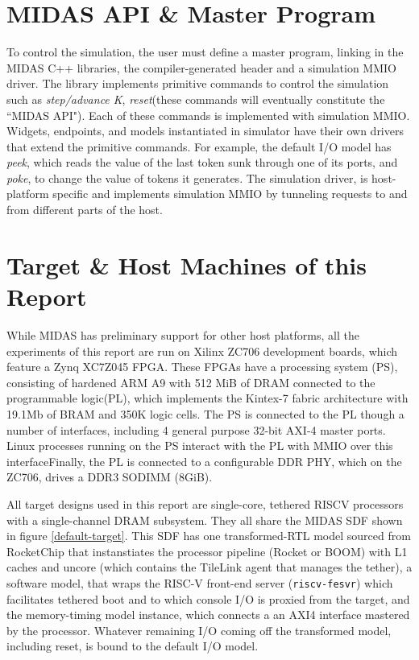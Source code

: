 \section{MIDAS API \& Master Program}

To control the simulation, the user must define a master program, linking in
the MIDAS C++ libraries, the compiler-generated header and a simulation MMIO
driver.  The library implements primitive commands to control the simulation
such as \emph{step/advance K}, \emph{reset}(these commands will eventually
constitute the ``MIDAS API"). Each of these commands is implemented with
simulation MMIO.  Widgets, endpoints, and models instantiated in simulator have
their own drivers that extend the primitive commands.  For example, the default
I/O model has \emph{peek}, which reads the value of the last token sunk through
one of its ports, and \emph{poke}, to change the value of tokens it generates.  The
simulation driver, is host-platform specific and implements simulation MMIO by
tunneling requests to and from different parts of the host.

\section{Target \& Host Machines of this Report}\label{sec:targetandhostmachines}

While MIDAS has preliminary support for other host platforms, all the
experiments of this report are run on Xilinx ZC706 development boards, which
feature a Zynq XC7Z045 FPGA. These FPGAs have a processing system (PS),
consisting of hardened ARM A9 with 512 MiB of DRAM connected to the
programmable logic(PL), which implements the Kintex-7 fabric architecture with
19.1Mb of BRAM and 350K logic cells. The PS is connected to the PL though a
number of interfaces, including 4 general purpose 32-bit AXI-4 master ports.
Linux processes running on the PS interact with the PL with MMIO over this
interfaceFinally, the PL is connected to a configurable DDR PHY, which on the
ZC706, drives a DDR3 SODIMM (8GiB).

All target designs used in this report are single-core, tethered RISCV
processors with a single-channel DRAM subsystem.  They all share the MIDAS SDF
shown in figure \ref{default-target}. This SDF has one transformed-RTL model
sourced from RocketChip that instanstiates the processor pipeline (Rocket or
BOOM) with L1 caches and uncore (which contains the TileLink agent that manages
the tether), a software model, that wraps the RISC-V front-end server
(\texttt{riscv-fesvr}) which facilitates tethered boot and to which console I/O
is proxied from the target, and the memory-timing model instance, which
connects a an AXI4 interface mastered by the processor. Whatever remaining I/O
coming off the transformed model, including reset, is bound to the default I/O
model.

